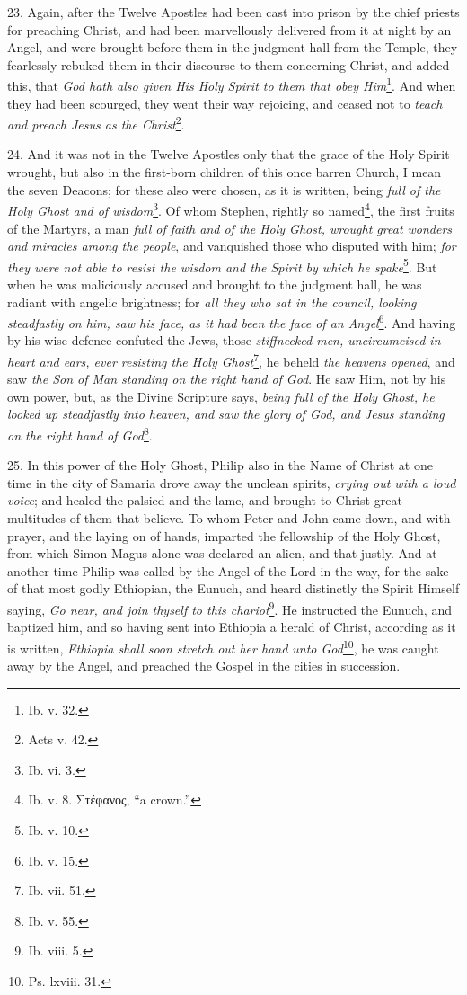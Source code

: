 23. Again, after the Twelve Apostles had been cast into prison by the chief priests for preaching Christ, and had been marvellously delivered from it at night by an Angel, and were brought before them in the judgment hall from the Temple, they fearlessly rebuked them in their discourse to them concerning Christ, and added this, that \emph{God hath also given His Holy Spirit to them that obey Him}\footnote{Ib. v. 32.}. And when they had been scourged, they went their way rejoicing, and ceased not to \emph{teach and preach Jesus as the Christ}\footnote{Acts v. 42.}.

24. And it was not in the Twelve Apostles only that the grace of the Holy Spirit wrought, but also in the first-born children of this once barren Church, I mean the seven Deacons; for these also were chosen, as it is written, being \emph{full of the Holy Ghost and of wisdom}\footnote{Ib. vi. 3.}. Of whom Stephen, rightly so named\footnote{Ib. v. 8. \textgreek{Στέφανος}, “a crown.”}, the first fruits of the Martyrs, a man \emph{full of faith and of the Holy Ghost, wrought great wonders and miracles among the people}, and vanquished those who disputed with him; \emph{for they were not able to resist the wisdom and the Spirit by which he spake}\footnote{Ib. v. 10.}. But when he was maliciously accused and brought to the judgment hall, he was radiant with angelic brightness; for \emph{all they who sat in the council, looking steadfastly on him, saw his face, as it had been the face of an Angel}\footnote{Ib. v. 15.}. And having by his wise defence confuted the Jews, those \emph{stiffnecked men, uncircumcised in heart and ears, ever resisting the Holy Ghost}\footnote{Ib. vii. 51.}, he beheld \emph{the heavens opened}, and saw \emph{the Son of Man standing on the right hand of God}. He saw Him, not by his own power, but, as the Divine Scripture says, \emph{being full of the Holy Ghost, he looked up steadfastly into heaven, and saw the glory of God, and Jesus standing on the right hand of God}\footnote{Ib. v. 55.}.

25. In this power of the Holy Ghost, Philip also in the Name of Christ at one time in the city of Samaria drove away the unclean spirits, \emph{crying out with a loud voice}; and healed the palsied and the lame, and brought to Christ great multitudes of them that believe. To whom Peter and John came down, and with prayer, and the laying on of hands, imparted the fellowship of the Holy Ghost, from which Simon Magus alone was declared an alien, and that justly. And at another time Philip was called by the Angel of the Lord in the way, for the sake of that most godly Ethiopian, the Eunuch, and heard distinctly the Spirit Himself saying, \emph{Go near, and join thyself to this chariot}\footnote{Ib. viii. 5.}. He instructed the Eunuch, and baptized him, and so having sent into Ethiopia a herald of Christ, according as it is written, \emph{Ethiopia shall soon stretch out her hand unto God}\footnote{Ps. lxviii. 31.}, he was caught away by the Angel, and preached the Gospel in the cities in succession.

